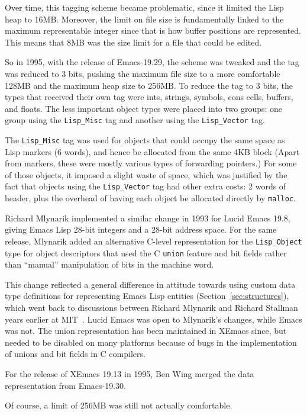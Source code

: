 \documentclass[format=acmsmall, review]{acmart}
\newcommand \Elisp {Emacs Lisp}
\begin{document}
Over time, this tagging scheme became problematic, since it limited the Lisp
heap to 16\;MB.
Moreover, the limit on file size is fundamentally linked to the maximum representable
integer since that is how buffer positions are represented.
This means that 8\;MB was the size limit for a file that could be edited.

So in 1995, with the release of Emacs-19.29,
the scheme was tweaked and the tag was reduced to
3 bits, pushing the maximum file size to a more comfortable 128\;MB and the
maximum heap size to 256\;MB.  To reduce the tag to 3 bits,
the types that received their own tag were ints, strings, symbols, cons
cells, buffers, and floats.
The less important
object types were placed into two groups: one group using the
\texttt{Lisp\_Misc} tag and another using the \texttt{Lisp\_Vector}
tag.

The \texttt{Lisp\_Misc} tag was used for objects that could occupy
the same space as Lisp markers (6 words), and hence be allocated from the same
4KB block  (Apart from markers, these were mostly various types of
forwarding pointers.)  For some of those objects, it imposed a slight waste of space,
which was justified by the fact that objects using the \texttt{Lisp\_Vector}
tag had other extra costs: 2 words of header, plus the overhead of having
each object be allocated directly by \texttt{malloc}.

Richard Mlynarik implemented a similar change in 1993 for Lucid Emacs
19.8, giving \Elisp{} 28-bit integers and a 28-bit address space.  For
the same release, Mlynarik added an alternative C-level representation for the
\texttt{Lisp\_Object} type for object descriptors that used
the C \texttt{union} feature and bit fields rather than ``manual''
manipulation of bits in the machine word.

This change reflected a general difference in attitude towards using
custom data type definitions for representing \Elisp{} entities
(Section~\ref{sec:structures}), which
went back to discussions between Richard Mlynarik and Richard Stallman
years earlier at MIT~\cite{Mlynarik-personal}.  Lucid Emacs was open
to Mlynarik's changes, while Emacs was not.
The union representation has been maintained in XEmacs since, but needed to be
disabled on many platforms because of bugs in the implementation of
unions and bit fields in C compilers.

For the release of XEmacs 19.13 in 1995, Ben Wing merged the data
representation from Emacs-19.30.

Of course, a limit of 256\;MB was still not actually comfortable.
\end{document}
